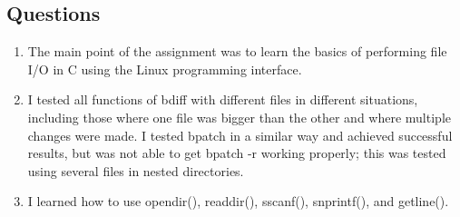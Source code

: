 \documentclass[letterpaper,10pt,fleqn]{article}
\numberwithin{equation}{section}
\begin{document}
\subsection*{Questions}
\begin{enumerate}
    \item The main point of the assignment was to learn the basics of performing file I/O in C using the Linux programming interface.
    \item I tested all functions of bdiff with different files in different situations, including those where one file was bigger than the other and where multiple changes were made.  I tested bpatch in a similar way and achieved successful results, but was not able to get bpatch -r working properly; this was tested using several files in nested directories.
    \item I learned how to use opendir(), readdir(), sscanf(), snprintf(), and getline().
\end{enumerate}
\end{document}
